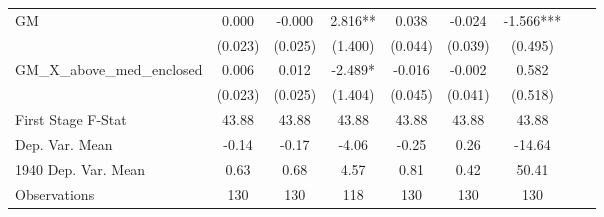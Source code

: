 \begin{tabular}{l*{8}{c}}
\cmidrule(lr){1-7}
GM              &    0.000   &   -0.000   &    2.816** &    0.038   &   -0.024   &   -1.566***\\
                &  (0.023)   &  (0.025)   &  (1.400)   &  (0.044)   &  (0.039)   &  (0.495)   \\
\addlinespace
GM\_X\_above\_med\_enclosed&    0.006   &    0.012   &   -2.489*  &   -0.016   &   -0.002   &    0.582   \\
                &  (0.023)   &  (0.025)   &  (1.404)   &  (0.045)   &  (0.041)   &  (0.518)   \\
\midrule
First Stage F-Stat&    43.88   &    43.88   &    43.88   &    43.88   &    43.88   &    43.88   \\
Dep. Var. Mean  &    -0.14   &    -0.17   &    -4.06   &    -0.25   &     0.26   &   -14.64   \\
1940 Dep. Var. Mean&     0.63   &     0.68   &     4.57   &     0.81   &     0.42   &    50.41   \\
Observations    &      130   &      130   &      118   &      130   &      130   &      130   \\
 \bottomrule \end{tabular}

